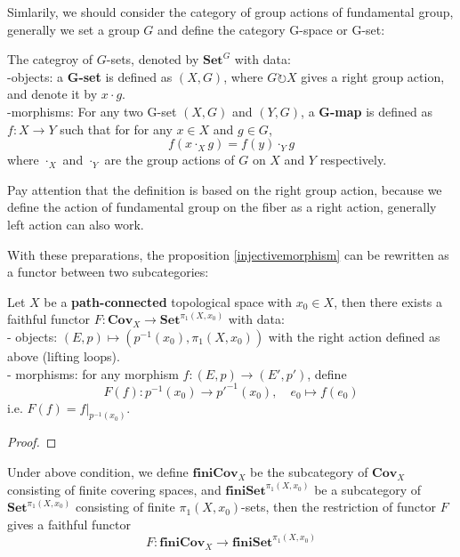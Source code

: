 \documentclass[12pt,a4paper]{article}
\begin{document}
Simlarily, we should consider the category of group actions of fundamental group, generally we set a group \(G\) and define the category G-space or G-set:

\begin{definitionplain}
    The categroy of \(G\)-sets, denoted by \(\mathbf{Set}^G\) with data:\\

    -objects: a \textbf{G-set} is defined as \((X,G)\), where \(G\circlearrowright X\) gives a right group action, and denote it by \(x \cdot g\).\\

    -morphisms: For any two G-set \((X,G)\) and \((Y,G)\), a \textbf{G-map} is defined as \(f:X \to Y\) such that for for any \(x \in X\) and \(g \in G\),
    \[f(x \cdot_X g) = f(y)\cdot_Y g\]
    where \(\cdot_X\) and \(\cdot_Y\) are the group actions of \(G\) on \(X\) and \(Y\) respectively.
\end{definitionplain}

Pay attention that the definition is based on the right group action, because we define the action of fundamental group on the fiber as a right action, generally left action can also work.

With these preparations, the proposition \ref{injectivemorphism} can be rewritten as a functor between two subcategories:
\begin{proposition}
    Let \(X\) be a \textbf{path-connected} topological space with \(x_0 \in X\), then there exists a faithful functor \(F:\mathbf{Cov}_X \to \mathbf{Set}^{\pi_1(X,x_0)}\) with data:\\

    - objects: \((E,p) \mapsto (p^{-1}(x_0), \pi_1(X,x_0))\) with the right action defined as above (lifting loops).\\

    - morphisms: for any morphism \(f:(E,p) \to (E',p')\), define
    \[F(f): p^{-1}(x_0) \to p'^{-1}(x_0), \quad e_0 \mapsto f(e_0)\]
    i.e. \(F(f) = f|_{p^{-1}(x_0)}\).
\end{proposition}
\begin{proof}
\end{proof}
\begin{corollary}
    Under above condition, we define \(\mathbf{finiCov}_X\) be the subcategory of \(\mathbf{Cov}_X\) consisting of finite covering spaces, and \(\mathbf{finiSet}^{\pi_1(X,x_0)}\) be a subcategory of \(\mathbf{Set}^{\pi_1(X,x_0)}\) consisting of finite \(\pi_1(X,x_0)\)-sets, then the restriction of functor \(F\) gives a faithful functor
    \[F:\mathbf{finiCov}_X \to \mathbf{finiSet}^{\pi_1(X,x_0)}\]
\end{corollary}
\end{document}
